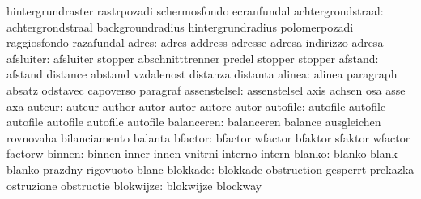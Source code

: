                            hintergrundraster         rastrpozadi
                           schermosfondo             ecranfundal
        achtergrondstraal: achtergrondstraal         backgroundradius
                           hintergrundradius         polomerpozadi
                           raggiosfondo              razafundal
                    adres: adres                     address
                           adresse                   adresa
                           indirizzo                 adresa
                afsluiter: afsluiter                 stopper
                           abschnitttrenner          predel
                           stopper                   stopper
                  afstand: afstand                   distance
                           abstand                   vzdalenost
                           distanza                  distanta
                   alinea: alinea                    paragraph
                           absatz                    odstavec
                           capoverso                 paragraf
             assenstelsel: assenstelsel              axis
                           achsen                    osa
                           asse                      axa
                   auteur: auteur                    author
                           autor                     autor
                           autore                    autor
                 autofile: autofile                  autofile             
                           autofile                  autofile             
                           autofile                  autofile %
               balanceren: balanceren                balance
                           ausgleichen               rovnovaha
                           bilanciamento             balanta
                  bfactor: bfactor                   wfactor
                           bfaktor                   sfaktor
                           wfactor                   factorw %
                   binnen: binnen                    inner
                           innen                     vnitrni
                           interno                   intern
                   blanko: blanko                    blank
                           blanko                    prazdny
                           rigovuoto                 blanc
                 blokkade: blokkade                  obstruction
                           gesperrt                  prekazka
                           ostruzione                obstructie
                blokwijze: blokwijze                 blockway
